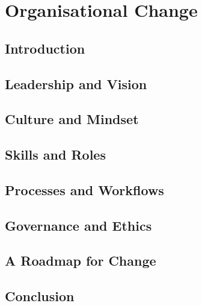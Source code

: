 \chapter{Organisational Change}
\label{chap:organisational_change}

\section{Introduction}
\label{sec:org_change_introduction}

\section{Leadership and Vision}
\label{sec:leadership_and_vision}

\section{Culture and Mindset}
\label{sec:culture_and_mindset}

\section{Skills and Roles}
\label{sec:skills_and_roles}

\section{Processes and Workflows}
\label{sec:processes_and_workflows}

\section{Governance and Ethics}
\label{sec:org_change_governance_ethics}

\section{A Roadmap for Change}
\label{sec:roadmap_for_change}

\section{Conclusion}
\label{sec:org_change_conclusion}